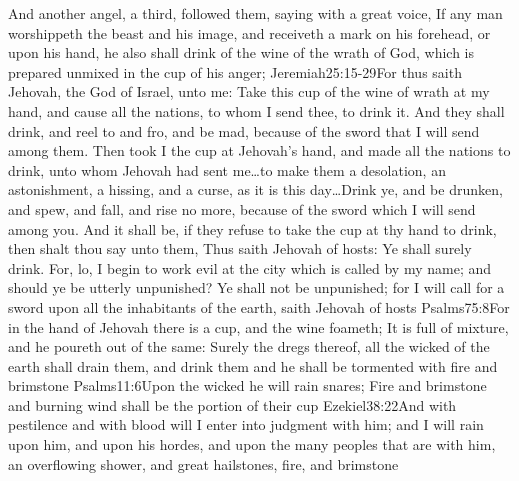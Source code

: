  And another angel, a third, followed them, saying with a great voice, If any man worshippeth the beast and his image, and receiveth a mark on his forehead, or upon his hand, 
 he also shall drink of the wine of the wrath of God, which is prepared unmixed in the cup of his anger;%
				   {Jeremiah}{25:15-29}{For thus saith Jehovah, the God of Israel, unto me: Take this cup of the wine of wrath at my hand, and cause all the nations, to whom I send thee, to drink it. And they shall drink, and reel to and fro, and be mad, because of the sword that I will send among them. Then took I the cup at Jehovah’s hand, and made all the nations to drink, unto whom Jehovah had sent me\ldots to make them a desolation, an astonishment, a hissing, and a curse, as it is this day\ldots Drink ye, and be drunken, and spew, and fall, and rise no more, because of the sword which I will send among you. And it shall be, if they refuse to take the cup at thy hand to drink, then shalt thou say unto them, Thus saith Jehovah of hosts: Ye shall surely drink. For, lo, I begin to work evil at the city which is called by my name; and should ye be utterly unpunished? Ye shall not be unpunished; for I will call for a sword upon all the inhabitants of the earth, saith Jehovah of hosts}%
				   {Psalms}{75:8}{For in the hand of Jehovah there is a cup, and the wine foameth; It is full of mixture, and he poureth out of the same: Surely the dregs thereof, all the wicked of the earth shall drain them, and drink them}
 and he shall be tormented with fire and brimstone%
					{Psalms}{11:6}{Upon the wicked he will rain snares; Fire and brimstone and burning wind shall be the portion of their cup}%
					{Ezekiel}{38:22}{And with pestilence and with blood will I enter into judgment with him; and I will rain upon him, and upon his hordes, and upon the many peoples that are with him, an overflowing shower, and great hailstones, fire, and brimstone}%
